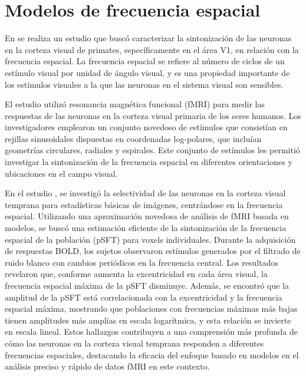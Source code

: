 \section*{Modelos de frecuencia espacial}

En \cite{broderick_mapping_2022} se realiza un estudio que buscó caracterizar la sintonización de las neuronas en la corteza visual de primates, específicamente en el área V1, en relación con la frecuencia espacial. La frecuencia espacial se refiere al número de ciclos de un estímulo visual por unidad de ángulo visual, y es una propiedad importante de los estímulos visuales a la que las neuronas en el sistema visual son sensibles.

El estudio utilizó resonancia magnética funcional (fMRI) para medir las respuestas de las neuronas en la corteza visual primaria de los seres humanos. Los investigadores emplearon un conjunto novedoso de estímulos que consistían en rejillas sinusoidales dispuestas en coordenadas log-polares, que incluían geometrías circulares, radiales y espirales. Este conjunto de estímulos les permitió investigar la sintonización de la frecuencia espacial en diferentes orientaciones y ubicaciones en el campo visual.

En el estudio \cite{aghajari_population_2020}, se investigó la selectividad de las neuronas en la corteza visual temprana para estadísticas básicas de imágenes, centrándose en la frecuencia espacial. Utilizando una aproximación novedosa de análisis de fMRI basada en modelos, se buscó una estimación eficiente de la sintonización de la frecuencia espacial de la población (pSFT) para voxels individuales. Durante la adquisición de respuestas BOLD, los sujetos observaron estímulos generados por el filtrado de ruido blanco con cambios periódicos en la frecuencia central. Los resultados revelaron que, conforme aumenta la excentricidad en cada área visual, la frecuencia espacial máxima de la pSFT disminuye. Además, se encontró que la amplitud de la pSFT está correlacionada con la excentricidad y la frecuencia espacial máxima, mostrando que poblaciones con frecuencias máximas más bajas tienen amplitudes más amplias en escala logarítmica, y esta relación se invierte en escala lineal. Estos hallazgos contribuyen a una comprensión más profunda de cómo las neuronas en la corteza visual temprana responden a diferentes frecuencias espaciales, destacando la eficacia del enfoque basado en modelos en el análisis preciso y rápido de datos fMRI en este contexto.